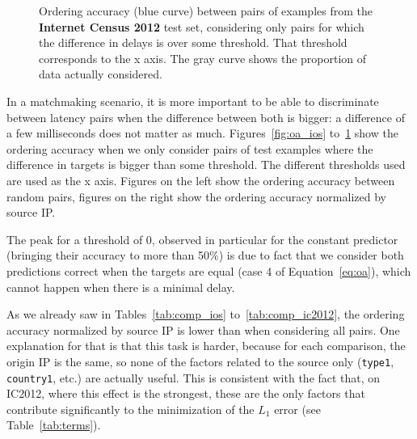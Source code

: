 \documentclass[10pt,a4paper,notitlepage,twocolumn]{article}
\begin{document}
\begin{figure}[p]
\caption{Ordering accuracy (blue curve) between pairs of examples from the {\bf
Internet Census 2012} test set, considering only pairs for which the difference
in delays is over some threshold. That threshold corresponds to the
x axis. The gray curve shows the proportion of data actually
considered.}
\label{fig:oa_ic2012}
\end{figure}

In a matchmaking scenario, it is more important to be able to
discriminate between latency pairs when the difference between both
is bigger: a difference of a few milliseconds does not matter as
much.  Figures~\ref{fig:oa_ios} to~\ref{fig:oa_ic2012} show the
ordering accuracy when we only consider pairs of test examples where
the difference in targets is bigger than some threshold. The different
thresholds used are used as the x axis. Figures on the left show the
ordering accuracy between random pairs, figures on the right show
the ordering accuracy normalized by source IP.

The peak for a threshold of 0, observed in particular for the constant
predictor (bringing their accuracy to more than 50\%) is due to fact
that we consider both predictions correct when the targets are equal
(case 4 of Equation~\ref{eq:oa}), which cannot happen when there
is a minimal delay.

As we already saw in Tables~\ref{tab:comp_ios} to~\ref{tab:comp_ic2012},
the ordering accuracy normalized by source IP is lower than when
considering all pairs.
One explanation for that is that this task is harder,
because for each comparison, the origin IP is the same, so none of the
factors related to the source only (\texttt{type1}, \texttt{country1},
etc.) are actually useful. This is consistent with the fact that, on
IC2012, where this effect is the strongest, these are the only factors
that contribute significantly to the minimization of the $L_1$ error (see
Table~\ref{tab:terms}).
\end{document}
